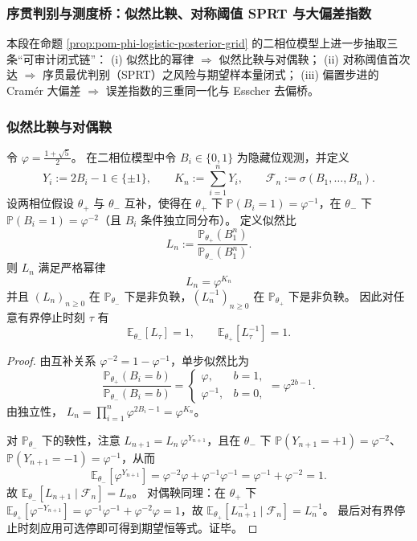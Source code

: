 \subsubsection{序贯判别与测度桥：似然比鞅、对称阈值 SPRT 与大偏差指数}\label{subsubsec:pom-golden-sequential-martingale-sprt-ldp}

本段在命题 \ref{prop:pom-phi-logistic-posterior-grid} 的二相位模型上进一步抽取三条“可审计闭式链”：
(i) 似然比的幂律 \(\Rightarrow\) 似然比鞅与对偶鞅；
(ii) 对称阈值首次达 \(\Rightarrow\) 序贯最优判别（SPRT）之风险与期望样本量闭式；
(iii) 偏置步进的 Cram\'er 大偏差 \(\Rightarrow\) 误差指数的三重同一化与 Esscher 去偏桥。

\subsubsection{似然比鞅与对偶鞅}

\begin{proposition}[黄金二相位隐藏位的似然比鞅与对偶鞅]\label{prop:pom-golden-likelihood-ratio-martingales}
令 \(\varphi=\frac{1+\sqrt5}{2}\)。
在二相位模型中令 \(B_i\in\{0,1\}\) 为隐藏位观测，并定义
\[
Y_i:=2B_i-1\in\{\pm 1\},\qquad
K_n:=\sum_{i=1}^{n}Y_i,\qquad
\mathcal{F}_n:=\sigma(B_1,\dots,B_n).
\]
设两相位假设 \(\theta_+\) 与 \(\theta_-\) 互补，使得在 \(\theta_+\) 下
\(\mathbb{P}(B_i=1)=\varphi^{-1}\)，在 \(\theta_-\) 下
\(\mathbb{P}(B_i=1)=\varphi^{-2}\)（且 \(B_i\) 条件独立同分布）。
定义似然比
\[
L_n:=\frac{\mathbb{P}_{\theta_+}(B_1^n)}{\mathbb{P}_{\theta_-}(B_1^n)}.
\]
则 \(L_n\) 满足严格幂律
\[
\boxed{\;L_n=\varphi^{K_n}\;}
\]
并且 \((L_n)_{n\ge 0}\) 在 \(\mathbb{P}_{\theta_-}\) 下是非负鞅，\((L_n^{-1})_{n\ge 0}\) 在 \(\mathbb{P}_{\theta_+}\) 下是非负鞅。
因此对任意有界停止时刻 \(\tau\) 有
\[
\boxed{\;\mathbb{E}_{\theta_-}[L_\tau]=1,\qquad \mathbb{E}_{\theta_+}[L_\tau^{-1}]=1.\;}
\]
\end{proposition}

\begin{proof}
由互补关系 \(\varphi^{-2}=1-\varphi^{-1}\)，单步似然比为
\[
\frac{\mathbb{P}_{\theta_+}(B_i=b)}{\mathbb{P}_{\theta_-}(B_i=b)}
=\begin{cases}
\varphi,& b=1,\\
\varphi^{-1},& b=0,
\end{cases}
=\varphi^{2b-1}.
\]
由独立性，
\(
L_n=\prod_{i=1}^{n}\varphi^{2B_i-1}=\varphi^{K_n}
\)。
\par
对 \(\mathbb{P}_{\theta_-}\) 下的鞅性，注意
\(
L_{n+1}=L_n\,\varphi^{Y_{n+1}}
\)，且在 \(\theta_-\) 下 \(\mathbb{P}(Y_{n+1}=+1)=\varphi^{-2}\)、\(\mathbb{P}(Y_{n+1}=-1)=\varphi^{-1}\)，从而
\[
\mathbb{E}_{\theta_-}[\varphi^{Y_{n+1}}]
=\varphi^{-2}\varphi+\varphi^{-1}\varphi^{-1}
=\varphi^{-1}+\varphi^{-2}
=1.
\]
故 \(\mathbb{E}_{\theta_-}[L_{n+1}\mid\mathcal{F}_n]=L_n\)。
对偶鞅同理：在 \(\theta_+\) 下 \(\mathbb{E}_{\theta_+}[\varphi^{-Y_{n+1}}]=\varphi^{-1}\varphi^{-1}+\varphi^{-2}\varphi=1\)，故 \(\mathbb{E}_{\theta_+}[L_{n+1}^{-1}\mid\mathcal{F}_n]=L_n^{-1}\)。
最后对有界停止时刻应用可选停即可得到期望恒等式。证毕。
\end{proof}

